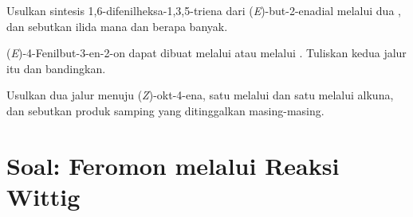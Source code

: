 \begin{exercise}[$\star\star\star$]\label{exo:b2:wittig:10}
Usulkan sintesis 1,6-difenilheksa-1,3,5-triena dari (\textit{E})-but-2-enadial
 melalui dua , dan sebutkan ilida mana dan
berapa banyak.
\end{exercise}

\begin{exercise}[$\star\star\star$]\label{exo:b2:wittig:11}
(\textit{E})-4-Fenilbut-3-en-2-on dapat dibuat melalui  atau
melalui . Tuliskan kedua jalur itu dan bandingkan.
\end{exercise}

\begin{exercise}[$\star\star\star$]\label{exo:b2:wittig:12}
Usulkan dua jalur menuju (\textit{Z})-okt-4-ena, satu melalui 
dan satu melalui alkuna, dan sebutkan produk samping yang ditinggalkan
masing-masing.
\end{exercise}

\section{Soal: Feromon melalui Reaksi Wittig}

